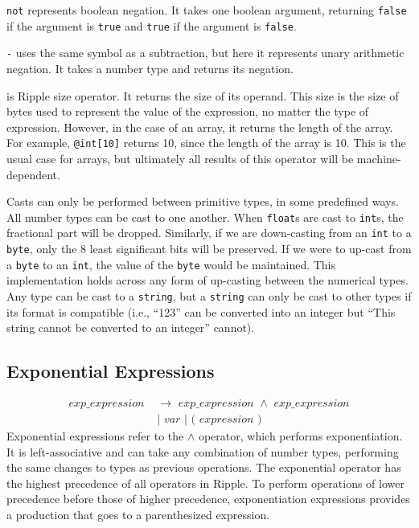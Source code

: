 \documentclass{article}
\newcommand{\code}{\texttt}
\begin{document}
\code{not} represents boolean negation. It takes one boolean argument, returning \code{false} if the argument is \code{true} and \code{true} if the argument is \code{false}.

\code{-} uses the same symbol as a subtraction, but here it represents unary arithmetic negation. It takes a number type and returns its negation.

\code{\MVAt} is Ripple size operator. It returns the size of its operand. This size is the size of bytes used to represent the value of the expression, no matter the type of expression. However, in the case of an array, it returns the length of the array. For example, \code{@int[10]} returns 10, since the length of the array is 10. This is the usual case for arrays, but ultimately all results of this operator will be machine-dependent.

Casts can only be performed between primitive types, in some predefined ways. All number types can be cast to one another. When \code{float}s are cast to \code{int}s, the fractional part will be dropped. Similarly, if we are down-casting from an \code{int} to a \code{byte}, only the 8 least significant bits will be preserved. If we were to up-cast from a \code{byte} to an \code{int}, the value of the \code{byte} would be maintained. This implementation holds across any form of up-casting between the numerical types. Any type can be cast to a \code{string}, but a \code{string} can only be cast to other types if its format is compatible (i.e., ``123'' can be converted into an integer but ``This string cannot be converted to an integer'' cannot).

\subsection{Exponential Expressions}
\begin{align*}
exp\_expression\,\,& \rightarrow\,\,exp\_expression\,\,\code{$\wedge$}\,\, exp\_expression\\
                    & |\,\,var\,\,|\,\,\code{(}\,\,expression\,\,\code{)}
\end{align*}
Exponential expressions refer to the \code{$\wedge$} operator, which performs exponentiation. It is left-associative and can take any combination of number types, performing the same changes to types as previous operations. The exponential operator has the highest precedence of all operators in Ripple. To perform operations of lower precedence before those of higher precedence, exponentiation expressions provides a production that goes to a parenthesized expression. 
\end{document}
